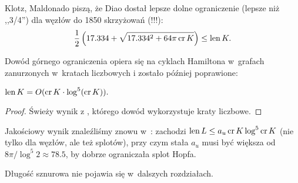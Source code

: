 Klotz, Maldonado \cite{klotz21} piszą, że Diao dostał lepsze dolne ograniczenie (lepsze niż ,,3/4'') dla węzłów do 1850 skrzyżowań (!!!):
\begin{equation}
    \frac 12 \left(17.334 + \sqrt{17.334^2 + 64 \pi \operatorname{cr} K}\right) \le \operatorname{len} K.
\end{equation}

Dowód górnego ograniczenia opiera się na cyklach Hamiltona w~grafach zanurzonych w~kratach liczbowych \cite{yu04} i zostało później poprawione:


\begin{proposition}
    $\operatorname{len} K = O(\operatorname{cr} K \cdot \log^5(\operatorname{cr} K)).$
\end{proposition}

\begin{proof}
    Świeży wynik z \cite{diao19}, którego dowód wykorzystuje kraty liczbowe.
\end{proof}

Jakościowy wynik znaleźliśmy znowu w~\cite{klotz21}: zachodzi $\operatorname{len} L \le a_u \operatorname{cr} K \log^5 \operatorname{cr} K$ (nie tylko dla węzłów, ale też splotów), przy czym stała $a_u$ musi być większa od $8\pi/\log^5 2 \approx 78.5$, by dobrze ograniczała splot Hopfa.

Długość sznurowa nie pojawia się w~dalszych rozdziałach.

%

